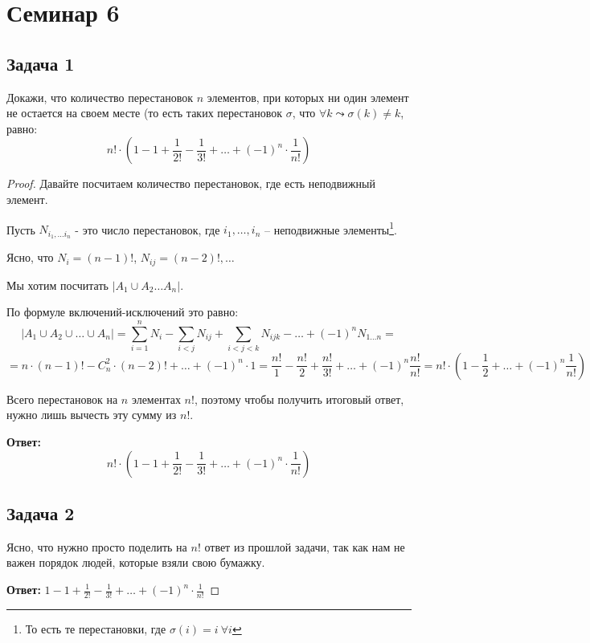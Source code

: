 
\section{Семинар 6}

\subsection{Задача 1}

Докажи, что количество перестановок $n$ элементов, при которых ни один элемент не
остается на своем месте (то есть таких перестановок $\sigma$, что $\forall k \leadsto \sigma(k) \neq  k$, равно:
\[
n! \cdot (1 - 1 + \frac{1}{2!} - \frac{1}{3!} + \ldots + (-1)^n \cdot \frac{1}{n!})
\]

\begin{proof}
Давайте посчитаем количество перестановок, где есть неподвижный элемент.

Пусть $N_{i_1, \ldots i_n}$ - это число перестановок, где $i_1, \ldots, i_n$ -- неподвижные элементы\footnote{То есть те перестановки, где $\sigma(i) = i \ \forall i $}.

Ясно, что $N_i = (n-1)!$, $N_{ij} = (n-2)!, \ldots$

Мы хотим посчитать $|A_1 \cup A_2 \ldots A_n|$.

По формуле включений-исключений это равно:
\[
|A_1 \cup A_2 \cup \ldots \cup A_n| = \sum_{i=1}^nN_i - \sum_{i<j}{N_{ij}} + \sum_{i<j<k}{N_{ijk}} - \ldots + (-1)^n N_{1\ldots n} =
\]
\[
= n \cdot (n-1)! - C^2_n \cdot (n-2)! + \ldots + (-1)^n \cdot 1 = \frac{n!}{1} - \frac{n!}{2} + \frac{n!}{3!} + \ldots + (-1)^n \frac{n!}{n!} = n! \cdot (1 - \frac{1}{2}  + \ldots + (-1)^n \frac{1}{n!})
\]

Всего перестановок на $n$ элементах $n!$, поэтому чтобы получить итоговый ответ, нужно лишь вычесть эту сумму из $n!$.

\textbf{Ответ:}
\[
n! \cdot (1 - 1 + \frac{1}{2!} - \frac{1}{3!} + \ldots + (-1)^n \cdot \frac{1}{n!})
\]
\subsection{Задача 2}

Ясно, что нужно просто поделить на $n!$ ответ из прошлой задачи, так как нам не важен порядок людей, которые взяли свою бумажку.

\textbf{Ответ:} $1 - 1 + \frac{1}{2!} - \frac{1}{3!} + \ldots + (-1)^n \cdot \frac{1}{n!}$


\end{proof}
